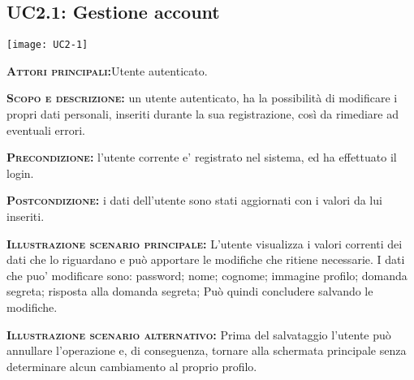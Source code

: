 \subsection{UC2.1: Gestione account}
\begin{center}
\texttt{[image: UC2-1]}
\end{center}
\begin{description}
\item{\scshape\bfseries Attori principali:}Utente autenticato.
\item{\scshape\bfseries Scopo e descrizione:} un utente autenticato, ha la possibilità di modificare i propri dati personali, inseriti durante la sua registrazione, così da rimediare ad eventuali errori.
\item{\scshape\bfseries Precondizione:} l'utente corrente e' registrato nel sistema, ed ha effettuato il login.
\item{\scshape\bfseries Postcondizione:} i dati dell'utente sono stati aggiornati con i valori da lui inseriti.
\item{\scshape\bfseries Illustrazione scenario principale:} L'utente visualizza i valori correnti dei dati che lo riguardano e può apportare
le modifiche che ritiene necessarie. I dati che puo' modificare sono:
password;
nome;
cognome;
immagine profilo;
domanda segreta;
risposta alla domanda segreta;
Può quindi concludere salvando le modifiche.
\item{\scshape\bfseries Illustrazione scenario alternativo:} Prima del salvataggio l'utente può annullare l'operazione e, di conseguenza,
tornare alla schermata principale senza determinare alcun cambiamento al proprio
profilo.
\end{description}

